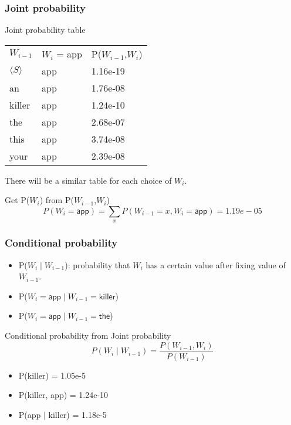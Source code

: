 \begin{frame}
\frametitle{Joint probability}
\centering
\begin{block}{Joint probability table}
\begin{tabular}{lll}
\rowcolor{MidnightBlue!50}
$W_{i-1}$ & $W_i$ = app & P($W_{i-1}$,$W_{i}$) \\
$\langle S \rangle$ & app & 1.16e-19 \\
an & app & 1.76e-08 \\
killer & app & 1.24e-10 \\
the & app & 2.68e-07 \\
this & app & 3.74e-08 \\
your & app &  2.39e-08
\end{tabular}

\smallskip
There will be a similar table for each choice of $W_i$.
\end{block}
\begin{block}{Get P($W_i$) from P($W_{i-1}$,$W_{i}$)}
\[ P(W_i=\textsf{app}) = \sum_{x} P(W_{i-1}=x,W_i=\textsf{app}) = 1.19e-05 \]
\end{block}
\end{frame}

\begin{frame}
\frametitle{Conditional probability}
\begin{itemize}[<+->]
\item P($W_{i} \mid W_{i-1}$): probability that $W_{i}$ has a certain value after fixing value of $W_{i-1}$.
\item P($W_{i} = \textsf{app} \mid W_{i-1} = \textsf{killer}$)
\item P($W_{i} = \textsf{app} \mid W_{i-1} = \textsf{the}$)
\end{itemize}
\pause
\begin{block}{Conditional probability from Joint probability}
\[ P(W_{i} \mid W_{i-1}) = \frac{P(W_{i-1}, W_i)}{P(W_{i-1})} \]
\begin{itemize}
\item P(killer) = 1.05e-5
\item P(killer, app) = 1.24e-10
\item P(app $\mid$ killer) = 1.18e-5
\end{itemize}

\end{block}
\end{frame}

